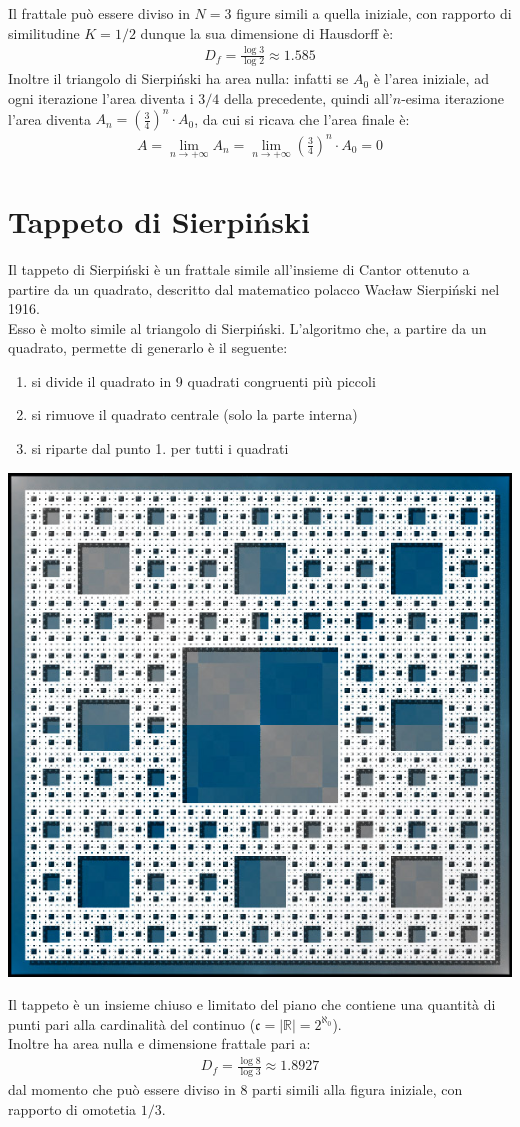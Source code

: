 \documentclass[10pt]{report}
\newcommand{\mb}{\mathbb}
\newcommand{\R}{\mb R}
\begin{document}
			Il frattale può essere diviso in $N = 3$ figure simili a quella iniziale, con rapporto di similitudine $K = 1/2$ dunque la sua dimensione di Hausdorff è:
			\begin{gather*}
				D_f = \frac{\log 3}{\log 2} \approx 1.585
			\end{gather*}
			Inoltre il triangolo di Sierpiński ha area nulla: infatti se $A_0$ è l'area iniziale, ad ogni iterazione l'area diventa i $3/4$ della precedente, quindi all'$n$-esima iterazione l'area diventa $A_n = \left( \frac{3}{4} \right) ^ n \cdot A_0$, da cui si ricava che l'area finale è:
			\begin{gather*}
				A = \lim_{n \to + \infty} A_n = \lim_{n \to +\infty} \left( \frac{3}{4} \right)^n \cdot A_0 = 0
			\end{gather*}
			
		\section{Tappeto di Sierpiński}
			Il tappeto di Sierpiński è un frattale simile all'insieme di Cantor ottenuto a partire da un quadrato, descritto dal matematico polacco Wacław Sierpiński nel 1916.\\
			Esso è molto simile al triangolo di Sierpiński. L'algoritmo che, a partire da un quadrato, permette di generarlo è il seguente:
			\begin{enumerate}
				\item si divide il quadrato in 9 quadrati congruenti più piccoli
				\item si rimuove il quadrato centrale (solo la parte interna)
				\item si riparte dal punto 1. per tutti i quadrati
			\end{enumerate}
			\begin{center}
				\includegraphics[width=0.3\linewidth]{"Tappeto di Sierpinski/tappeto_sierpinski"}
			\end{center}
			
			Il tappeto è un insieme chiuso e limitato del piano che contiene una quantità di punti pari alla cardinalità del continuo ($\mathfrak{c} = |\R| = 2^{\aleph_0}$).\\
			Inoltre ha area nulla e dimensione frattale pari a:
			\begin{gather*}
				D_f = \frac{ \log 8 }{ \log 3 } \approx 1.8927
			\end{gather*}
			dal momento che può essere diviso in $8$ parti simili alla figura iniziale, con rapporto di omotetia $1/3$.
		
\end{document}
